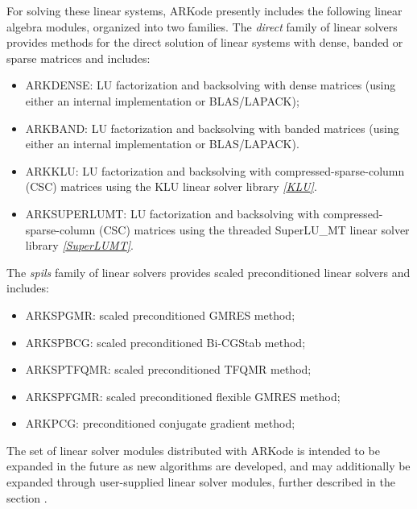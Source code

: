 \documentclass[letterpaper,10pt,english]{sphinxmanual}
\begin{document}
For solving these linear systems, ARKode presently includes the
following linear algebra modules, organized into two families.  The
\emph{direct} family of linear solvers provides methods for the direct
solution of linear systems with dense, banded or sparse matrices and
includes:
\begin{itemize}
\item {} 
ARKDENSE: LU factorization and backsolving with dense matrices
(using either an internal implementation or BLAS/LAPACK);

\item {} 
ARKBAND: LU factorization and backsolving with banded matrices
(using either an internal implementation or BLAS/LAPACK).

\item {} 
ARKKLU: LU factorization and backsolving with
compressed-sparse-column (CSC) matrices using the KLU linear solver
library \label{Organization:id1}{\hyperref[References:klu]{\emph{{[}KLU{]}}}}.

\item {} 
ARKSUPERLUMT: LU factorization and backsolving with
compressed-sparse-column (CSC) matrices using the threaded
SuperLU\_MT linear solver library \label{Organization:id2}{\hyperref[References:superlumt]{\emph{{[}SuperLUMT{]}}}}.

\end{itemize}

The \emph{spils} family of linear solvers provides scaled preconditioned
linear solvers and includes:
\begin{itemize}
\item {} 
ARKSPGMR: scaled preconditioned GMRES method;

\item {} 
ARKSPBCG: scaled preconditioned Bi-CGStab method;

\item {} 
ARKSPTFQMR: scaled preconditioned TFQMR method;

\item {} 
ARKSPFGMR: scaled preconditioned flexible GMRES method;

\item {} 
ARKPCG: preconditioned conjugate gradient method;

\end{itemize}

The set of linear solver modules distributed with ARKode is
intended to be expanded in the future as new algorithms are developed,
and may additionally be expanded through user-supplied linear solver
modules, further described in the section {\hyperref[linear_solvers/custom:linearsolvers-custom]{\emph{}}}.
\end{document}
